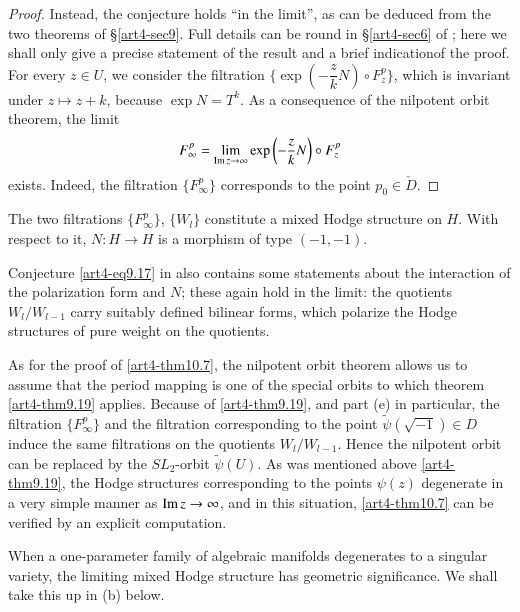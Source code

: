 \begin{proof}
Instead, the conjecture holds ``in the limit'', as can be deduced from the two theorems of \S \ref{art4-sec9}. Full details can be round in \S \ref{art4-sec6} of \cite{art4-key41}; here we shall only give a precise statement of the result and a brief indication\pageoriginale of the proof. For every $z \in U$, we consider the filtration $\{\exp \left( - \dfrac{z}{k} N\right) \circ F^p_z\}$, which is invariant under $z \longmapsto z +k$, because $\exp N = T^k$. As a consequence of the nilpotent orbit theorem, the limit
\begin{equation}
F^p_\infty = \lim\limits_{\operatorname{Im} z \to \infty} \exp \left(-\frac{z}{k} N \right) \circ F^p_z 
\label{art4-eq10.6}
\end{equation}
exists. Indeed, the filtration $\{F^p_\infty\}$ corresponds to the point $p_0 \in \check{D}$.
\end{proof}

\begin{theorem}\label{art4-thm10.7}
The two filtrations $\{F^p_\infty\}$, $\{W_l\}$ constitute a mixed Hodge structure on $H$. With respect to it, $N : H \to H$ is a morphism of type $(-1, -1)$.
\end{theorem}


Conjecture \eqref{art4-eq9.17} in \cite{art4-key21} also contains some statements about the interaction of the polarization form and $N$; these again hold in the limit: the quotients $W_l / W_{l-1}$ carry suitably defined bilinear forms, which polarize the Hodge structures of pure weight on the quotients.

As for the proof of \eqref{art4-thm10.7}, the nilpotent orbit theorem allows us to assume that the period mapping is one of the special orbits to which theorem \eqref{art4-thm9.19} applies. Because of \eqref{art4-thm9.19}, and part (e) in particular, the filtration $\{F^p_\infty\}$ and the filtration corresponding to the point $\tilde{\psi}(\sqrt{-1}) \in D$ induce the same filtrations on the quotients $W_l / W_{l-1}$. Hence the nilpotent orbit can be replaced by the $SL_2$-orbit $\tilde{\psi} (U)$. As was mentioned above \eqref{art4-thm9.19}, the Hodge structures corresponding to the points $\psi (z)$ degenerate in a very simple manner as $\operatorname{Im} z \to \infty$, and in this situation, \eqref{art4-thm10.7} can be verified by an explicit computation.

When a one-parameter family of algebraic manifolds degenerates to a singular variety, the limiting mixed Hodge structure has geometric significance. We shall take this up in (b) below.


